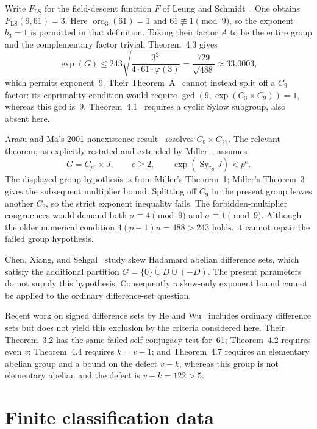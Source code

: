 \documentclass[11pt]{article}
\begin{document}
\begin{appendices}
Write $F_{\mathrm{LS}}$ for the field-descent function $F$ of Leung and
Schmidt~\cite[Definition~2.6]{LeungSchmidt2005}. One obtains
$F_{\mathrm{LS}}(9,61)=3$. Here $\operatorname{ord}_3(61)=1$ and
$61\not\equiv1\pmod9$, so the exponent $b_3=1$ is permitted in
that definition. Taking their factor $A$ to be the entire group and
the complementary factor trivial, Theorem~4.3 gives
\[
 \exp(G)\leq243\sqrt{\frac{3^2}{4\cdot61\cdot\varphi(3)}}
 =\frac{729}{\sqrt{488}}\approx33.0003,
\]
which permits exponent~9. Their Theorem~A~\cite[Theorem~A]{LeungSchmidt2005} cannot instead split off a
$C_9$ factor: its coprimality condition would require
$\gcd(9,\exp(C_3\times C_9))=1$, whereas this gcd is~9.
Theorem~4.1~\cite[Theorem~4.1]{LeungSchmidt2005} requires a cyclic Sylow subgroup, also absent here.

Arasu and Ma's 2001 nonexistence result~\cite{ArasuMa2001} resolves
$C_9\times C_{27}$. The relevant theorem, as explicitly restated and
extended by Miller~\cite[Theorems~1 and~3]{Miller2025}, assumes
\[
 G=C_{p^e}\times J,\qquad e\geq2,\qquad
 \exp(\operatorname{Syl}_p J)<p^e.
\]
The displayed group hypothesis is from Miller's Theorem~1; Miller's
Theorem~3 gives the subsequent multiplier bound. Splitting off $C_9$ in the present group leaves another $C_9$, so
the strict exponent inequality fails. The forbidden-multiplier
congruences would demand both $\sigma\equiv4\pmod9$ and
$\sigma\equiv1\pmod9$. Although the older numerical condition
$4(p-1)n=488>243$ holds, it cannot repair the failed group
hypothesis.

Chen, Xiang, and Sehgal~\cite{ChenXiangSehgal1994} study skew Hadamard
abelian difference sets, which satisfy the additional partition
$G=\{0\}\mathbin{\dot\cup}D\mathbin{\dot\cup}(-D)$.
The present parameters do not supply this hypothesis. Consequently
a skew-only exponent bound cannot be applied to the ordinary
difference-set question.

Recent work on signed difference sets by He and
Wu~\cite{HeWu2026} includes ordinary difference sets but does not
yield this exclusion by the criteria considered here. Their
Theorem~3.2 has the same failed self-conjugacy test for~61;
Theorem~4.2 requires even $v$; Theorem~4.4 requires $k=v-1$;
and Theorem~4.7 requires an elementary abelian group and a bound on
the defect $v-k$, whereas this group is not elementary abelian and the
defect is $v-k=122>5$.

\section{Finite classification data}\label{app:finite}


\end{appendices}
\end{document}
